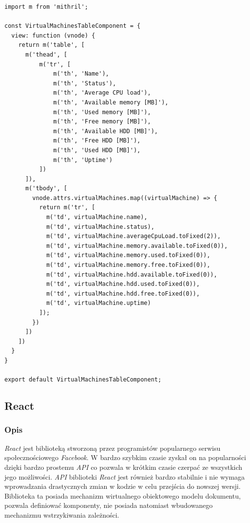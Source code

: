 \documentclass[polish, twoside, 12pt]{mwart}
\begin{document}
\begin{lstlisting}[caption=Komponent tabeli]
import m from 'mithril';

const VirtualMachinesTableComponent = {
  view: function (vnode) {
    return m('table', [
      m('thead', [
          m('tr', [
              m('th', 'Name'),
              m('th', 'Status'),
              m('th', 'Average CPU load'),
              m('th', 'Available memory [MB]'),
              m('th', 'Used memory [MB]'),
              m('th', 'Free memory [MB]'),
              m('th', 'Available HDD [MB]'),
              m('th', 'Free HDD [MB]'),
              m('th', 'Used HDD [MB]'),
              m('th', 'Uptime')
          ])
      ]),
      m('tbody', [
        vnode.attrs.virtualMachines.map((virtualMachine) => {
          return m('tr', [
            m('td', virtualMachine.name),
            m('td', virtualMachine.status),
            m('td', virtualMachine.averageCpuLoad.toFixed(2)),
            m('td', virtualMachine.memory.available.toFixed(0)),
            m('td', virtualMachine.memory.used.toFixed(0)),
            m('td', virtualMachine.memory.free.toFixed(0)),
            m('td', virtualMachine.hdd.available.toFixed(0)),
            m('td', virtualMachine.hdd.used.toFixed(0)),
            m('td', virtualMachine.hdd.free.toFixed(0)),
            m('td', virtualMachine.uptime)
          ]);
        })
      ])
    ])
  }
}

export default VirtualMachinesTableComponent;
\end{lstlisting}

\subsection{React}

\subsubsection{Opis}

\emph{React} \cite{react} jest biblioteką stworzoną przez programistów popularnego serwisu społecznościowego \emph{Facebook}. W bardzo szybkim czasie zyskał on na popularności dzięki bardzo prostemu \emph{API} co pozwala w krótkim czasie czerpać ze wszystkich jego możliwości. \emph{API} biblioteki \emph{React} jest również bardzo stabilnie i nie wymaga wprowadzania drastycznych zmian w kodzie w celu przejścia do nowszej wersji. Biblioteka ta posiada mechanizm wirtualnego obiektowego modelu dokumentu, pozwala definiować komponenty, nie posiada natomiast wbudowanego mechanizmu wstrzykiwania zależności.
\end{document}
